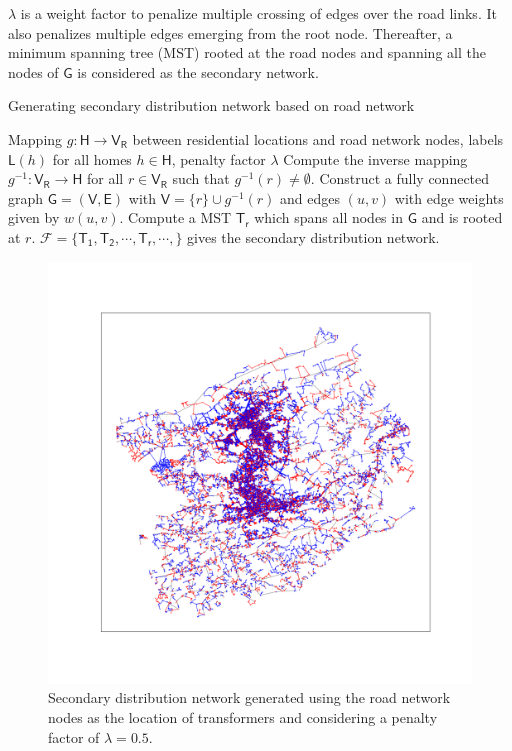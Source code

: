 \documentclass[11pt,letterpaper]{article}
\begin{document}
$\lambda$ is a weight factor to penalize multiple crossing of edges over the road links. It also penalizes multiple edges emerging from the root node. Thereafter, a minimum spanning tree (MST) rooted at the road nodes and spanning all the nodes of $\mathsf{G}$ is considered as the secondary network.
\begin{algorithm}
	\caption{Generating secondary distribution network based on road network}
	\label{alg:1}
	\begin{algorithmic}[1]
		\REQUIRE Mapping $g:\mathsf{H}\rightarrow\mathsf{V_R}$ between residential locations and road network nodes, labels $\mathsf{L}(h)$ for all homes $h\in\mathsf{H}$, penalty factor $\lambda$
		\STATE Compute the inverse mapping $g^{-1}:\mathsf{V_R}\rightarrow\mathsf{H}$ for all $r\in\mathsf{V_R}$ such that $g^{-1}(r)\neq\emptyset$.
		\STATE Construct a fully connected graph $\mathsf{G}=(\mathsf{V},\mathsf{E})$ with $\mathsf{V}=\{r\}\cup g^{-1}(r)$ and edges $(u,v)$ with edge weights given by $w(u,v)$.
		\STATE Compute a MST $\mathsf{T_r}$ which spans all nodes in $\mathsf{G}$ and is rooted at $r$.
		\ENDFOR
		\STATE $\mathcal{F}=\{\mathsf{T_1},\mathsf{T_2},\cdots,\mathsf{T_r},\cdots,\}$ gives the secondary distribution network.
	\end{algorithmic}
\end{algorithm}
\begin{figure}[h]
	\centering
	\includegraphics[width=\textwidth]{met-1}
	\caption{Secondary distribution network generated using the road network nodes as the location of transformers and considering a penalty factor of $\lambda=0.5$.}
	\label{fig:method-1}
\end{figure}
\end{document}
